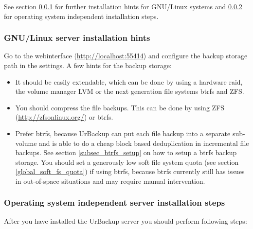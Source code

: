 \documentclass[a4paper,10pt]{article}
\begin{document}
\noindent See section \ref{gnu_linux_installation_hints} for further installation hints for GNU/Linux systems and \ref{os_independent_installation_steps} for operating system independent installation steps.

\subsubsection{GNU/Linux server installation hints}
\label{gnu_linux_installation_hints}

Go to the webinterface (\url{http://localhost:55414}) and configure the backup storage path in the settings. A few hints for the backup storage:
\begin{itemize}
  \item It should be easily extendable, which can be done by using a hardware raid, the volume manager LVM or the next generation file systems btrfs and ZFS.
  \item You should compress the file backups. This can be done by using ZFS (\url{http://zfsonlinux.org/}) or btrfs.
  \item Prefer btrfs, because UrBackup can put each file backup into a separate sub-volume and is able to do a cheap block based deduplication in incremental file backups. See section \ref{subsec_btrfs_setup} on how to setup a btrfs backup storage. You should set a generously low soft file system quota (see section \ref{global_soft_fs_quota})  if using btrfs, because btrfs currently still has issues in out-of-space situations and may require manual intervention.
\end{itemize}

\subsubsection{Operating system independent server installation steps}
\label{os_independent_installation_steps}

After you have installed the UrBackup server you should perform following steps:
\end{document}
